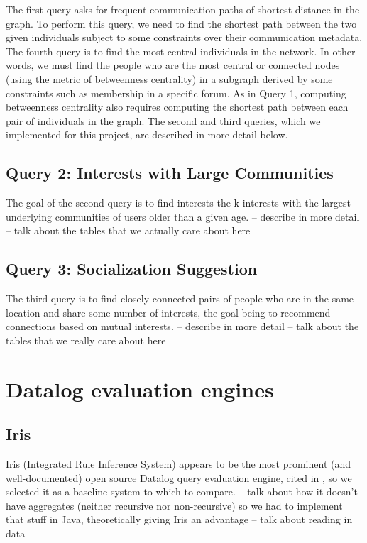 \documentclass{article}
\begin{document}
\begin{multicols}{2}
The first query asks for frequent communication paths of shortest distance in the graph. To perform this query, we need to find the shortest path between the two given individuals subject to some constraints over their communication metadata. The fourth query is to find the most central individuals in the network. In other words, we must find the people who are the most central or connected nodes (using the metric of betweenness centrality) in a subgraph derived by some constraints such as membership in a specific forum. As in Query 1, computing betweenness centrality also requires computing the shortest path between each pair of individuals in the graph. The second and third queries, which we implemented for this project, are described in more detail below.

\subsection{Query 2: Interests with Large Communities}
The goal of the second query is to find interests the k interests with the largest underlying communities of users older than a given age. 
-- describe in more detail 
-- talk about the tables that we actually care about here

\subsection{Query 3: Socialization Suggestion}
The third query is to find closely connected pairs of people who are in the same location and share some number of interests, the goal being to recommend connections based on mutual interests.
-- describe in more detail
-- talk about the tables that we really care about here

\section{Datalog evaluation engines}

\subsection{Iris}

Iris (Integrated Rule Inference System) appears to be the most prominent (and well-documented) open source Datalog query evaluation engine, cited in \cite{seo-et-al-13a}, so we selected it as a baseline system to which to compare.
-- talk about how it doesn't have aggregates (neither recursive nor non-recursive) so we had to implement that stuff in Java, theoretically giving Iris an advantage
-- talk about reading in data


\end{multicols}
\end{document}

